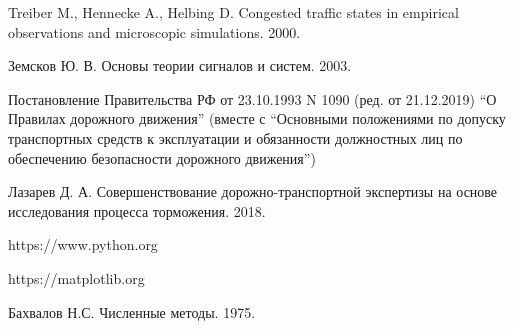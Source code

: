 \documentclass[12pt, a4paper]{extarticle}
\numberwithin{equation}{section}
\numberwithin{figure}{section}
\begin{document}
\begin{thebibliography}{**}
	Treiber M., Hennecke A., Helbing D. Congested traffic states in empirical observations and
	microscopic simulations. 2000.
	
	Земсков Ю. В. Основы теории сигналов и систем. 2003.
	
	Постановление Правительства РФ от 23.10.1993 N 1090 (ред. от 21.12.2019) ``О Правилах дорожного движения'' (вместе с ``Основными положениями по допуску транспортных средств к эксплуатации и обязанности должностных лиц по обеспечению безопасности дорожного движения'')

	Лазарев Д. А. Совершенствование дорожно-транспортной экспертизы на основе исследования процесса торможения. 2018.

	https://www.python.org
	
	https://matplotlib.org
	
	Бахвалов Н.С.  Численные методы. 1975. 

\end{thebibliography}

\newpage
\end{document}
